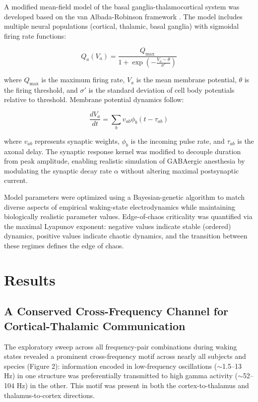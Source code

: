\documentclass[12pt]{article}
\begin{document}
A modified mean-field model of the basal ganglia-thalamocortical system was developed based on the van Albada-Robinson framework \citep{vanalbada2009mean}. The model includes multiple neural populations (cortical, thalamic, basal ganglia) with sigmoidal firing rate functions:

\begin{equation}
Q_a(V_a) = \frac{Q_{\max}}{1 + \exp\left(-\frac{V_a - \theta}{\sigma'}\right)}
\end{equation}

\noindent where $Q_{\max}$ is the maximum firing rate, $V_a$ is the mean membrane potential, $\theta$ is the firing threshold, and $\sigma'$ is the standard deviation of cell body potentials relative to threshold. Membrane potential dynamics follow:

\begin{equation}
\frac{dV_a}{dt} = \sum_b v_{ab} \phi_b(t - \tau_{ab})
\end{equation}

\noindent where $v_{ab}$ represents synaptic weights, $\phi_b$ is the incoming pulse rate, and $\tau_{ab}$ is the axonal delay. The synaptic response kernel was modified to decouple duration from peak amplitude, enabling realistic simulation of GABAergic anesthesia by modulating the synaptic decay rate $\alpha$ without altering maximal postsynaptic current.

Model parameters were optimized using a Bayesian-genetic algorithm to match diverse aspects of empirical waking-state electrodynamics while maintaining biologically realistic parameter values. Edge-of-chaos criticality was quantified via the maximal Lyapunov exponent: negative values indicate stable (ordered) dynamics, positive values indicate chaotic dynamics, and the transition between these regimes defines the edge of chaos.

\section{Results}

\subsection{A Conserved Cross-Frequency Channel for Cortical-Thalamic Communication}

The exploratory sweep across all frequency-pair combinations during waking states revealed a prominent cross-frequency motif across nearly all subjects and species (Figure 2): information encoded in low-frequency oscillations ($\sim$1.5--13 Hz) in one structure was preferentially transmitted to high gamma activity ($\sim$52--104 Hz) in the other. This motif was present in both the cortex-to-thalamus and thalamus-to-cortex directions.
\end{document}
